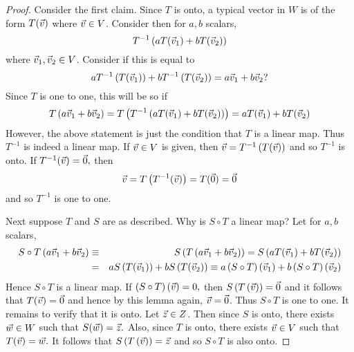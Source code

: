 \begin{proof}
Consider the first claim. Since $T$ is onto, a typical
vector in $W$ is of the form $T(\vec{v})$ where $\vec{v} \in V$. Consider then for $a,b$
scalars, 
\begin{equation*}
T^{-1}\left( aT(\vec{v}_{1})+bT(\vec{v}_{2})\right)
\end{equation*}
where $\vec{v}_{1}, \vec{v}_2 \in V$. Consider if this is equal to 
\begin{equation*}
aT^{-1}\left( T(\vec{v}_{1})\right) +bT^{-1}\left( T(\vec{v}_{2})\right) =a\vec{v}_{1}+b\vec{v}_{2}?
\end{equation*}
Since $T$ is one to one, this will be so if 
\begin{equation*}
T\left( a\vec{v}_{1}+b\vec{v}_{2}\right) =T\left( T^{-1}\left( aT(\vec{v}_{1})+bT(\vec{v}_{2})\right)
\right) =aT(\vec{v}_{1})+bT(\vec{v}_{2})
\end{equation*}
However, the above statement is just the condition that $T$ is a linear map.
Thus $T^{-1}$ is indeed a linear map. If $\vec{v} \in V$ is given, then $
\vec{v}=T^{-1}\left( T(\vec{v})\right) $ and so $T^{-1}$ is onto. If $T^{-1}(\vec{v})=\vec{0},$ then 
\begin{equation*}
\vec{v}=T\left( T^{-1}(\vec{v})\right) =T(\vec{0})=\vec{0}
\end{equation*}
and so  $T^{-1}$ is one to one.

Next suppose $T$ and $S$ are as described. Why is $S\circ T$ a linear map?
Let for $a,b$ scalars,
\begin{eqnarray*}
S\circ T\left( a\vec{v}_{1}+b\vec{v}_{2}\right) &\equiv &S\left( T\left(
a\vec{v}_{1}+b\vec{v}_{2}\right) \right) =S\left( aT(\vec{v}_{1})+bT(\vec{v}_{2})\right) \\
&=&aS\left( T(\vec{v}_{1})\right) +bS\left( T(\vec{v}_{2})\right) \equiv a\left( S\circ
T\right) \left( \vec{v}_{1}\right) +b\left( S\circ T\right) \left( \vec{v}_{2}\right)
\end{eqnarray*}
Hence $S\circ T$ is a linear map. If $\left( S\circ T\right) \left( \vec{v}\right)
=0,$ then $S\left( T\left( \vec{v} \right) \right) =\vec{0}$ and it follows that $T(\vec{v})=\vec{0}$ and hence by this lemma again, $\vec{v}=\vec{0}$. Thus $S\circ
T $ is one to one. It remains to verify that it is onto. Let $\vec{z}\in Z$. Then
since $S$ is onto, there exists $\vec{w}\in W$ such that $S(\vec{w})=\vec{z}.$ Also, since $T$
is onto, there exists $\vec{v}\in V$ such that $T(\vec{v})=\vec{w}.$ It follows that $S\left(
T\left( \vec{v}\right) \right) =\vec{z}$ and so $S\circ T$ is also onto.
\end{proof}

